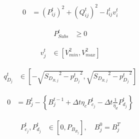 \documentclass[../../outputs/main.tex]{subfiles}
\begin{document}
\vspace{-1.5em} %

\begin{align}
    {0} &= {(P_{ij}^{t})^2 + (Q_{ij}^{t})^2 - l_{ij}^t v_i^t} \label{eq:ApparentPowerEquationBFM} &&
\end{align}

\vspace{-1.5em} %

\begin{align}
    {P^t_{Subs}} &\geq {0} \label{eq:substationRealPowerLimits} &&
\end{align}

\vspace{-1.5em} %



\begin{align}
    { v^{t}_{j} } &\in { \left[ V^{2}_{min}, V^{2}_{max} \right]} \label{eq:lim_vj} &&
\end{align}

\vspace{-1.5em} %

\begin{align}
    { q^{t}_{D_{j}} } 
    &\in
    { \left[-\sqrt{ {S_{D_{R, j}}}^2 - {p^{t}_{D_{j}}}^2}, \sqrt{ {S_{D_{R, j}}}^2 - {p^{t}_{D_{j}}}^2}\right] } \label{eq:qDj} &&
\end{align}

\vspace{-1.5em} %

\begin{align}
    {0} &= {  B_{j}^{t} - \left\{B_{j}^{t-1} + \Delta t  \eta_c P_{c_j}^t - \Delta t\frac{1}{\eta_d} P_{d_j}^t \right\} } \label{eq:SOC-j} &&
\end{align}

\vspace{-1.5em} %

\begin{align}
    { P^{t}_{c_{j}}, P^{t}_{d_{j}} }
    &\in
    { \left[ 0, P_{B_{R_{j}}} \right]}, \quad B_{j}^{0}=B_{j}^{T} \label{eq:lim_PcPdj} &&
\end{align}
\end{document}
